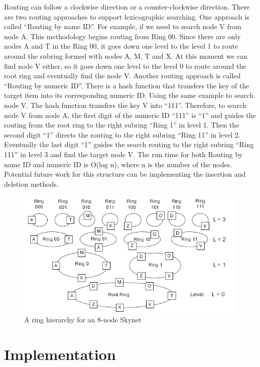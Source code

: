 \documentclass[oribibl]{llncs}
\begin{document}
Routing can follow a clockwise direction or a counter-clockwise direction. There are two routing approaches to support lexicographic searching. One approach is called “Routing by name ID”. For example, if we need to search node V from node A. This methodology begins routing from Ring 00. Since there are  only nodes A and T in the Ring 00, it goes down one level to the level 1 to route around the subring formed with nodes A, M, T and X. At this moment we can find node V either, so it goes down one level to the level 0 to route around the root ring and eventually find the node V. Another routing approach is called “Routing by numeric ID”. There is a hash function that transfers the key of the target item into its corresponding numeric ID. Using the same example to search node V. The hash function transfers the key V into “111”. Therefore, to search node V from node A, the first digit of the numeric ID “111” is “1” and guides the routing from the root ring to the right subring “Ring 1” in level 1. Then the second digit “1” directs the routing to the right subring “Ring 11” in level 2. Eventually the last digit “1” guides the search routing to the right subring “Ring 111” in level 3 and find the target node V. The run time for both Routing by name ID and numeric ID is O(log n), where n is the number of the nodes.  Potential future work for this structure can be implementing the insertion and deletion methods.

\begin{figure}[here]
\center
\includegraphics[width=12cm]{images/skynet1}
\caption{A ring hierarchy for an 8-node Skynet}
\label{fig:jumplist}
\end{figure}


\section{Implementation}
\label{sctn:implementation}
\end{document}
